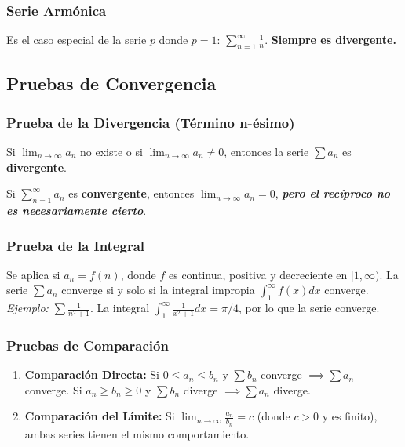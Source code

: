 \documentclass[a4paper,12pt]{article}
\begin{document}
\subsubsection{Serie Armónica}
Es el caso especial de la serie $p$ donde $p=1$: $\sum_{n=1}^{\infty} \frac{1}{n}$.
\textbf{Siempre es divergente.}

\subsection{Pruebas de Convergencia}

\subsubsection{Prueba de la Divergencia (Término n-ésimo)}
Si $\lim_{n \to \infty} a_n$ no existe o si $\lim_{n \to \infty} a_n \neq 0$, entonces la serie $\sum a_n$ es \textbf{divergente}.
\begin{tcolorbox}
    Si $\sum_{n=1}^{\infty} a_n$ es \textbf{convergente}, entonces $\lim_{n \to \infty} a_n = 0$, \textit{\textbf{pero el recíproco no es necesariamente cierto}}.
\end{tcolorbox}







\subsubsection{Prueba de la Integral}
Se aplica si $a_n = f(n)$, donde $f$ es continua, positiva y decreciente en $[1, \infty)$. La serie $\sum a_n$ converge si y solo si la integral impropia $\int_{1}^{\infty} f(x) dx$ converge.
\textit{Ejemplo:} $\sum \frac{1}{n^2+1}$. La integral $\int_{1}^{\infty} \frac{1}{x^2+1} dx = \pi/4$, por lo que la serie converge.

\subsubsection{Pruebas de Comparación}
\begin{enumerate}
    \item \textbf{Comparación Directa:} Si $0 \leq a_n \leq b_n$ y $\sum b_n$ converge $\implies \sum a_n$ converge. Si $a_n \geq b_n \geq 0$ y $\sum b_n$ diverge $\implies \sum a_n$ diverge.
    \item \textbf{Comparación del Límite:} Si $\lim_{n \to \infty} \frac{a_n}{b_n} = c$ (donde $c > 0$ y es finito), ambas series tienen el mismo comportamiento.
\end{enumerate}
\end{document}
